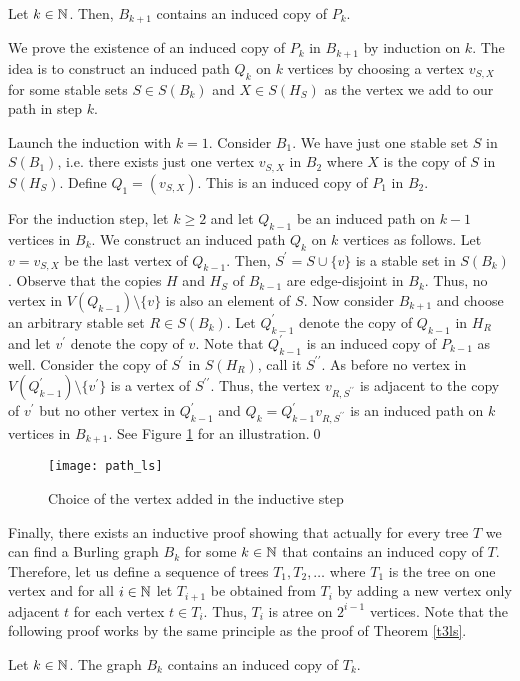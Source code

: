 \begin{thm}\label{t3ls}
Let $k\in\mathbb{N}$. Then, $B_{k+1}$ contains an induced copy of $P_k$.
\end{thm}
\begin{prf}
We prove the existence of an induced copy of $P_k$ in $B_{k+1}$ by induction on $k$. The idea is to construct an induced path $Q_k$ on $k$ vertices by choosing a vertex $v_{S,X}$ for some stable sets $S\in S(B_k)$ and $X\in S(H_S)$ as the vertex we add to our path in step $k$.

Launch the induction with $k=1$. Consider $B_1$. We have just one stable set $S$ in $S(B_1)$, i.e. there exists just one vertex $v_{S,X}$ in $B_2$ where $X$ is the copy of $S$ in $S(H_S)$. Define $Q_1=(v_{S,X})$. This is an induced copy of $P_1$  in $B_2$.

For the induction step, let $k\geq 2$ and let $Q_{k-1}$ be an induced path on $k-1$ vertices in $B_k$. We construct an induced path $Q_k$ on $k$ vertices as follows. Let $v=v_{S,X}$ be the last vertex of $Q_{k-1}$. Then, $S^\prime = S\cup \lbrace v\rbrace$ is a stable set in $S(B_k)$. Observe that the copies $H$ and $H_S$ of $B_{k-1}$ are edge-disjoint in $B_k$. Thus, no vertex in $V(Q_{k-1})\setminus\lbrace v\rbrace$ is also an element of $S$. Now consider $B_{k+1}$ and choose an arbitrary stable set $R\in S(B_k)$. Let $Q_{k-1}^\prime$ denote the copy of $Q_{k-1}$ in $H_R$ and let $v^\prime$ denote the copy of $v$. Note that $Q_{k-1}^\prime$ is an induced copy of $P_{k-1}$ as well. Consider the copy of $S^\prime$ in $S(H_R)$, call it $S^{\prime\prime}$. As before no vertex in $V(Q_{k-1}^\prime )\setminus\lbrace v^\prime\rbrace$ is a vertex of $S^{\prime\prime}$. Thus, the vertex $v_{R,S^{\prime\prime}}$ is adjacent to the copy of $v^\prime$ but no other vertex in $Q_{k-1}^\prime$ and $Q_k=Q_{k-1}^\prime v_{R,S^{\prime\prime}}$ is an induced path on $k$ vertices in $B_{k+1}$. See Figure \ref{f3ls} for an illustration.\qed
\end{prf}

\begin{figure}[ht]
\begin{center}
\texttt{[image: path\_ls]}
\end{center}
\caption{Choice of the vertex added in the inductive step}
\label{f3ls}
\end{figure}

Finally, there exists an inductive proof showing that actually for every tree $T$ we can find a Burling graph $B_k$ for some $k\in\mathbb{N}$ that contains an induced copy of $T$. Therefore, let us define a sequence of trees $T_1, T_2, \dots$ where $T_1$ is the tree on one vertex and for all $i\in\mathbb{N}$ let $T_{i+1}$ be obtained from $T_i$ by adding a new vertex only adjacent $t$ for each vertex $t\in T_i$. Thus, $T_i$ is atree on $2^{i-1}$ vertices. Note that the following proof works by the same principle as the proof of Theorem \ref{t3ls}.
\newpage
\begin{thm}\label{t1ls}
Let $k\in\mathbb{N}$. The graph $B_k$ contains an induced copy of $T_k$.
\end{thm}

